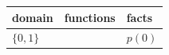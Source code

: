 \documentclass[border=5pt]{standalone}
\begin{document}
\begin{tabular}{lll}
domain & functions & facts \\
\hline
$\{0, 1\}$ &  & $p(0)$ \\
\end{tabular}
\end{document}
